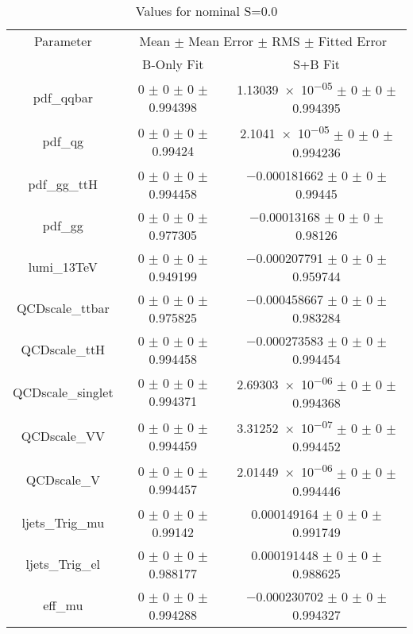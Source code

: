 \begin{table}
\centering
\caption{Values for nominal S=0.0}
\begin{tabular}{ccc}
\toprule
Parameter 	& \multicolumn{2}{c}{Mean $\pm$ Mean Error $\pm$ RMS $\pm$ Fitted Error}\\
 	& B-Only Fit & S+B Fit\\
\midrule
pdf\_qqbar 	& \num{0} $\pm$ \num{0} $\pm$ \num{0} $\pm$ \num{0.994398} 	& \num{1.13039e-05} $\pm$ \num{0} $\pm$ \num{0} $\pm$ \num{0.994395}\\
pdf\_qg 	& \num{0} $\pm$ \num{0} $\pm$ \num{0} $\pm$ \num{0.99424} 	& \num{2.1041e-05} $\pm$ \num{0} $\pm$ \num{0} $\pm$ \num{0.994236}\\
pdf\_gg\_ttH 	& \num{0} $\pm$ \num{0} $\pm$ \num{0} $\pm$ \num{0.994458} 	& \num{-0.000181662} $\pm$ \num{0} $\pm$ \num{0} $\pm$ \num{0.99445}\\
pdf\_gg 	& \num{0} $\pm$ \num{0} $\pm$ \num{0} $\pm$ \num{0.977305} 	& \num{-0.00013168} $\pm$ \num{0} $\pm$ \num{0} $\pm$ \num{0.98126}\\
lumi\_13TeV 	& \num{0} $\pm$ \num{0} $\pm$ \num{0} $\pm$ \num{0.949199} 	& \num{-0.000207791} $\pm$ \num{0} $\pm$ \num{0} $\pm$ \num{0.959744}\\
QCDscale\_ttbar 	& \num{0} $\pm$ \num{0} $\pm$ \num{0} $\pm$ \num{0.975825} 	& \num{-0.000458667} $\pm$ \num{0} $\pm$ \num{0} $\pm$ \num{0.983284}\\
QCDscale\_ttH 	& \num{0} $\pm$ \num{0} $\pm$ \num{0} $\pm$ \num{0.994458} 	& \num{-0.000273583} $\pm$ \num{0} $\pm$ \num{0} $\pm$ \num{0.994454}\\
QCDscale\_singlet 	& \num{0} $\pm$ \num{0} $\pm$ \num{0} $\pm$ \num{0.994371} 	& \num{2.69303e-06} $\pm$ \num{0} $\pm$ \num{0} $\pm$ \num{0.994368}\\
QCDscale\_VV 	& \num{0} $\pm$ \num{0} $\pm$ \num{0} $\pm$ \num{0.994459} 	& \num{3.31252e-07} $\pm$ \num{0} $\pm$ \num{0} $\pm$ \num{0.994452}\\
QCDscale\_V 	& \num{0} $\pm$ \num{0} $\pm$ \num{0} $\pm$ \num{0.994457} 	& \num{2.01449e-06} $\pm$ \num{0} $\pm$ \num{0} $\pm$ \num{0.994446}\\
ljets\_Trig\_mu 	& \num{0} $\pm$ \num{0} $\pm$ \num{0} $\pm$ \num{0.99142} 	& \num{0.000149164} $\pm$ \num{0} $\pm$ \num{0} $\pm$ \num{0.991749}\\
ljets\_Trig\_el 	& \num{0} $\pm$ \num{0} $\pm$ \num{0} $\pm$ \num{0.988177} 	& \num{0.000191448} $\pm$ \num{0} $\pm$ \num{0} $\pm$ \num{0.988625}\\
eff\_mu 	& \num{0} $\pm$ \num{0} $\pm$ \num{0} $\pm$ \num{0.994288} 	& \num{-0.000230702} $\pm$ \num{0} $\pm$ \num{0} $\pm$ \num{0.994327}\\

\end{tabular}
\end{table}
